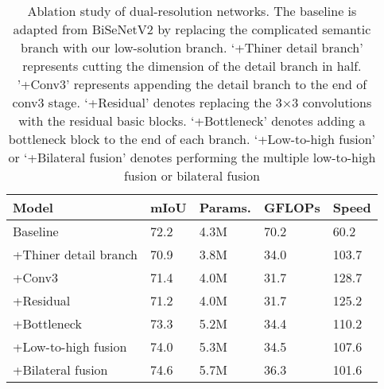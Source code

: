 \documentclass[journal]{IEEEtran}
\begin{document}
\begin{table}[]
\caption{Ablation study of dual-resolution networks. The baseline is adapted from BiSeNetV2 by replacing the complicated semantic branch with our low-solution branch. `+Thiner detail branch' represents cutting the dimension of the detail branch in half. '+Conv3' represents appending the detail branch to the end of conv3 stage. `+Residual' denotes replacing the 3$\times$3 convolutions with the residual basic blocks. `+Bottleneck' denotes adding a bottleneck block to the end of each branch. `+Low-to-high fusion' or `+Bilateral fusion' denotes performing the multiple low-to-high fusion or bilateral fusion}
\label{tab:11}
\begin{tabular}{p{72pt}p{30pt}<{\centering}p{30pt}<{\centering}p{30pt}<{\centering}p{30pt}<{\centering}}
\toprule
Model                     & mIoU                & Params.              & GFLOPs      & Speed\\ \midrule
Baseline                  & 72.2                & 4.3M                & 70.2        & 60.2  \\
+Thiner detail branch     & 70.9                & 3.8M                & 34.0        & 103.7 \\
+Conv3                    & 71.4                & 4.0M                & 31.7        & 128.7 \\
+Residual                 & 71.2                & 4.0M                & 31.7        & 125.2 \\
+Bottleneck               & 73.3                & 5.2M                & 34.4        & 110.2 \\
+Low-to-high fusion       & 74.0                & 5.3M                & 34.5        & 107.6 \\
+Bilateral fusion         & 74.6                & 5.7M                & 36.3        & 101.6 \\ \bottomrule
\end{tabular}
\end{table}
\end{document}

